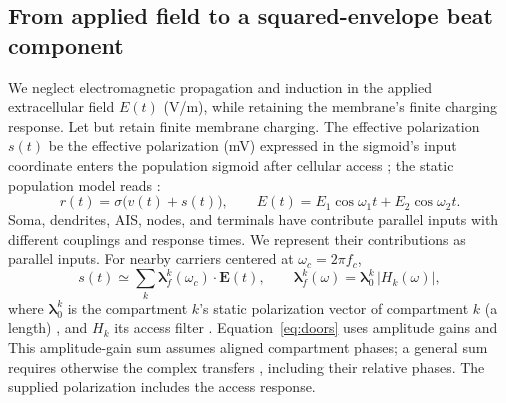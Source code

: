 \documentclass[11pt,a4paper]{article}
\newcommand{\Sig}{\sigma}
\providecommand{\DIFaddtex}[1]{{\protect\color{blue} \sf #1}} %
\providecommand{\DIFdeltex}[1]{{\protect\color{red} \scriptsize #1}} %
\providecommand{\DIFaddbegin}{} %
\providecommand{\DIFaddend}{} %
\providecommand{\DIFdelbegin}{} %
\providecommand{\DIFdelend}{} %
\providecommand{\DIFadd}[1]{\texorpdfstring{\DIFaddtex{#1}}{#1}} %
\providecommand{\DIFdel}[1]{\texorpdfstring{\DIFdeltex{#1}}{}} %
\begin{document}
\subsection{From applied field to a squared-envelope beat component}\label{sec:coupling}
We neglect \DIFdelbegin \DIFdel{electromagnetic }\DIFdelend propagation and induction in the \DIFdelbegin \DIFdel{applied }\DIFdelend \DIFaddbegin \DIFadd{extracellular }\DIFaddend field $E(t)$ (V/m),
\DIFdelbegin \DIFdel{while retaining the membrane's finite charging response. Let }\DIFdelend \DIFaddbegin \DIFadd{but retain finite membrane charging. The effective polarization }\DIFaddend $s(t)$ \DIFdelbegin \DIFdel{be the
effective polarization }\DIFdelend (mV)
\DIFdelbegin \DIFdel{expressed in the sigmoid's input coordinate }\DIFdelend \DIFaddbegin \DIFadd{enters the population sigmoid }\DIFaddend after cellular access\DIFdelbegin \DIFdel{;
the static population model reads
}\DIFdelend \DIFaddbegin \DIFadd{:
}\DIFaddend \begin{equation}
r(t)=\Sig\!\big(v(t)+s(t)\big),\qquad
E(t)=E_1\cos\omega_1 t+E_2\cos\omega_2 t .
\label{eq:coupling}
\end{equation}
Soma, dendrites, AIS, nodes, and terminals \DIFdelbegin \DIFdel{have }\DIFdelend \DIFaddbegin \DIFadd{contribute parallel inputs with
}\DIFaddend different couplings and response times. \DIFdelbegin \DIFdel{We represent their contributions as parallel inputs.
}\DIFdelend For nearby carriers centered at
$\omega_c=2\pi f_c$,
\begin{equation}
s(t)\simeq\sum_k \boldsymbol\lambda^k_f(\omega_c)\!\cdot\!\mathbf E(t),\qquad
\boldsymbol\lambda^k_f(\omega)=\boldsymbol\lambda^k_0\,\lvert H_k(\omega)\rvert,
\label{eq:doors}
\end{equation}
where $\boldsymbol\lambda^k_0$ is \DIFdelbegin \DIFdel{the }\DIFdelend \DIFaddbegin \DIFadd{compartment $k$'s }\DIFaddend static polarization vector
\DIFdelbegin \DIFdel{of compartment $k$ }\DIFdelend (a length) \DIFdelbegin \DIFdel{,
}\DIFdelend and $H_k$ its access filter \cite{ruffini2025rosetta,galangadea2023}.
\DIFdelbegin \DIFdel{Equation~\eqref{eq:doors} uses amplitude
gains and }\DIFdelend \DIFaddbegin \DIFadd{This amplitude-gain sum }\DIFaddend assumes aligned compartment phases; \DIFdelbegin \DIFdel{a general sum requires }\DIFdelend \DIFaddbegin \DIFadd{otherwise }\DIFaddend the
complex transfers \DIFdelbegin \DIFdel{, including their relative phases. The supplied polarization includes the access response.
}%
\end{document}
